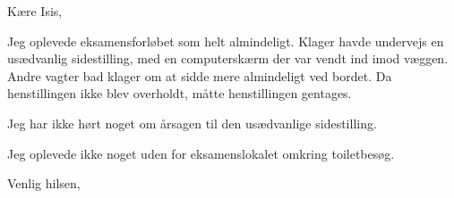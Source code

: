 \documentclass[11pt,a4paper]{letter}
\date{\vest\today}
\let\letterclassopening\opening
\renewcommand{\opening}[1]{\letterclassopening{#1}\vspace{2em}}
\renewcommand{\closing}[1]{\par\vspace{2em}\noindent #1\par\vspace{1em}\noindent\fromsig\par}
\begin{document}
\begin{letter}{}
\opening{Kære Isis,}

Jeg oplevede eksamensforløbet som helt almindeligt. Klager havde undervejs en usædvanlig sidestilling, med en computerskærm der var vendt ind imod væggen. Andre vagter bad klager om at sidde mere almindeligt ved bordet. Da henstillingen ikke blev overholdt, måtte henstillingen gentages.

Jeg har ikke hørt noget om årsagen til den usædvanlige sidestilling.

Jeg oplevede ikke noget uden for eksamenslokalet omkring toiletbesøg.
\closing{Venlig hilsen,}

\end{letter}
\end{document}
